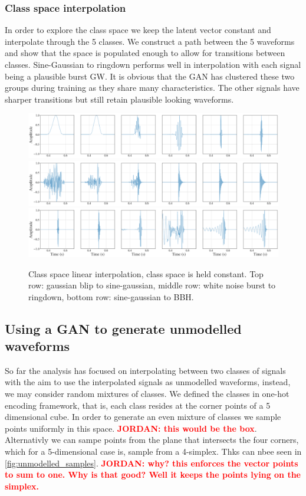 \documentclass[12pt]{iopart}
\newcommand{\jordan}[1]{\textbf{\textcolor{red}{JORDAN: #1}}}
\begin{document}
\subsubsection{Class space interpolation}
In order to explore the class space we keep the latent vector constant and interpolate through the 5 classes. We construct a path between the 5 waveforms and show that the space is populated enough to allow for transitions between classes. Sine-Gaussian to ringdown performs well in interpolation with each signal being a plausible burst GW. It is obvious that the GAN has clustered these two groups during training as they share many characteristics. The other signals have sharper transitions but still retain plausible looking waveforms. 

\begin{figure}
    \centering
    \includegraphics[width=\textwidth]{figures/generations/interp_blip-sg.png}
    \includegraphics[width=\textwidth]{figures/generations/interp_wnb-rd.png}
    \includegraphics[width=\textwidth]{figures/generations/interp_sg-bbh.png}
    \caption{Class space linear interpolation, class space is held constant. Top row: gaussian blip to sine-gaussian, middle row: white noise burst to ringdown, bottom row: sine-gaussian to BBH.}
    \label{fig:c_interp}
\end{figure}

\subsection{Using a GAN to generate unmodelled waveforms}
So far the analysis has focused on interpolating between two classes of signals with the aim to use the interpolated signals as unmodelled waveforms, instead, we may consider random mixtures of classes. We defined the classes in one-hot encoding framework, that is, each class resides at the corner points of a 5 dimensional cube. In order to generate an even mixture of classes we sample points uniformly in this space. \jordan{this would be the box}. Alternativly we can sampe points from the plane that intersects the four corners, which for a 5-dimensional case is, sample from a 4-simplex. Thks can nbee seen in \ref{fig:unmodelled_samples}. \jordan{why? this enforces the vector points to sum to one. Why is that good? Well it keeps the points lying on the simplex.} 
\end{document}
